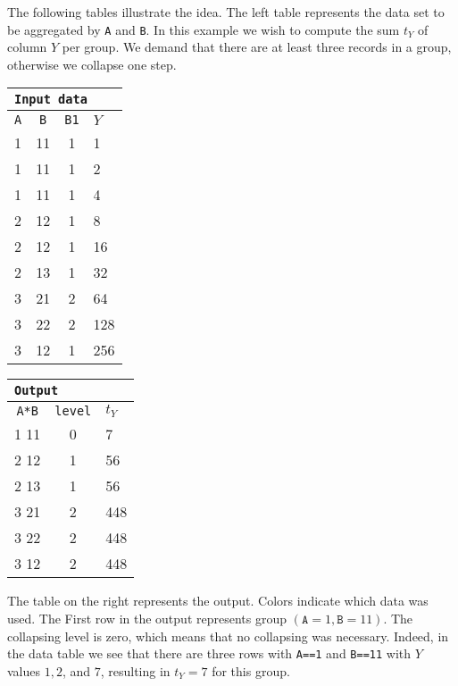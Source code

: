 \documentclass[11pt, fleqn]{article}
\begin{document}
The following tables illustrate the idea. The left table represents the data
set to be aggregated by \texttt{A} and \texttt{B}. In this example we wish to
compute the sum $t_Y$ of column $Y$ per group. We demand that there are at
least three records in a group, otherwise we collapse one step.
%
\begin{center}
\begin{tabular}{cccl}
\multicolumn{4}{l}{\texttt{Input data}}\\
\hline
\texttt{A} & \texttt{B} & \texttt{B1} & $Y$\\
\hline
\cellcolor{red!25}   1 &\cellcolor{red!25}   11 &                1       & \cellcolor{red!25}   1   \\
\cellcolor{red!25}   1 &\cellcolor{red!25}   11 &                1       & \cellcolor{red!25}   2   \\
\cellcolor{red!25}   1 &\cellcolor{red!25}   11 &                1       & \cellcolor{red!25}   4   \\
\cellcolor{green!25} 2 &                     12 & \cellcolor{green!25} 1 & \cellcolor{green!25} 8   \\
\cellcolor{green!25} 2 &                     12 & \cellcolor{green!25} 1 & \cellcolor{green!25} 16  \\
\cellcolor{green!25} 2 &                     13 & \cellcolor{green!25} 1 & \cellcolor{green!25} 32  \\
\cellcolor{blue!25}  3 &                     21 &                2       & \cellcolor{blue!25}  64  \\
\cellcolor{blue!25}  3 &                     22 &                2       & \cellcolor{blue!25}  128 \\
\cellcolor{blue!25}  3 &                     12 &                1       & \cellcolor{blue!25}  256 \\
\hline
\end{tabular}\hspace{1cm}\begin{tabular}{ccl}
\multicolumn{3}{l}{\texttt{Output}}\\
\hline
\texttt{A*B} & \texttt{level} & $t_Y$\\
\hline
\rowcolor{red!25}   1 11        & 0             & 7  \\
\rowcolor{green!25} 2 12        & 1             & 56 \\
\rowcolor{green!25} 2 13        & 1             & 56 \\
\rowcolor{blue!25}  3 21        & 2             & 448\\
\rowcolor{blue!25}  3 22        & 2             & 448\\
\rowcolor{blue!25}  3 12        & 2             & 448\\
\hline
\end{tabular}
\end{center}
%
The table on the right represents the output. Colors indicate which data was
used. The First row in the output represents group
$(\texttt{A}=1,\texttt{B}=11)$. The collapsing level is zero, which means
that no collapsing was necessary. Indeed, in the data table we see that there
are three rows with \texttt{A==1} and \texttt{B==11} with $Y$ values $1, 2$,
and $7$, resulting in $t_Y=7$ for this group.
\end{document}
